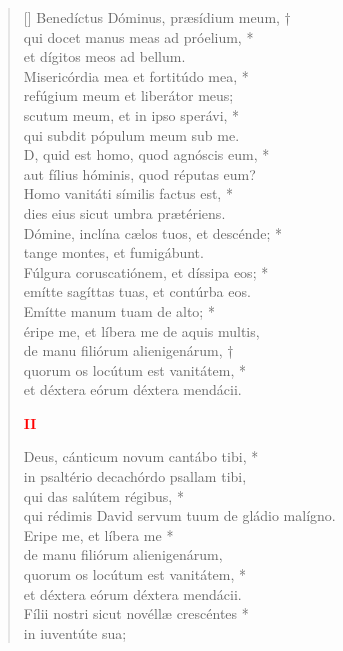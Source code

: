 \begin{verse}[\versewidth]
Benedíctus Dóminus, præsídium meum, †\\
qui docet manus meas ad próelium, *\\
et dígitos meos ad bellum.\\
\vin Misericórdia mea et fortitúdo mea, *\\
\vin refúgium meum et liberátor meus;\\
scutum meum, et in ipso sperávi, *\\
qui subdit pópulum meum sub me.\\
D, quid est homo, quod agnóscis eum, *\\
\vin aut fílius hóminis, quod réputas eum?\\
Homo vanitáti símilis factus est, *\\
dies eius sicut umbra prætériens.\\
\vin Dómine, inclína cælos tuos, et descénde; *\\
\vin tange montes, et fumigábunt.\\
Fúlgura coruscatiónem, et díssipa eos; *\\
emítte sagíttas tuas, et contúrba eos.\\
\vin Emítte manum tuam de alto; *\\
\vin éripe me, et líbera me de aquis multis,\\
de manu filiórum alienigenárum, †\\
quorum os locútum est vanitátem, *\\
et déxtera eórum déxtera mendácii.\\
\vspace{0.3cm}
\begin{center}
 \textcolor{red}{\bf II}
\end{center}
Deus, cánticum novum cantábo tibi, *\\
in psaltério decachórdo psallam tibi,\\
qui das salútem régibus, *\\
qui rédimis David servum tuum de gládio malígno.\\
Eripe me, et líbera me *\\
de manu filiórum alienigenárum,\\
quorum os locútum est vanitátem, *\\
et déxtera eórum déxtera mendácii.\\
Fílii nostri sicut novéllæ crescéntes *\\
in iuventúte sua;\\

\end{verse}
